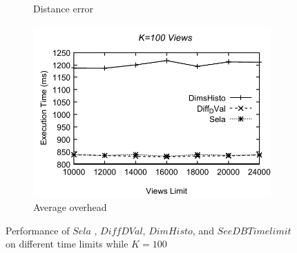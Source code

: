 \begin{figure}[t]
\begin{subfigure}[b]{0.32\textwidth}
    \caption{Distance error}
        \label{fig:tlfig11}%
  \end{subfigure}
  \begin{subfigure}[b]{0.32\textwidth}
    \includegraphics[width=\textwidth]{tl2.pdf}
     \caption{Average overhead}
        \label{fig:tlfig2}
  \end{subfigure}
  \caption{Performance of $Sela$ , $Diff DVal$, $DimHisto$, and $SeeDB Timelimit$ on different time limits while $K=100$}
\end{figure}





  

